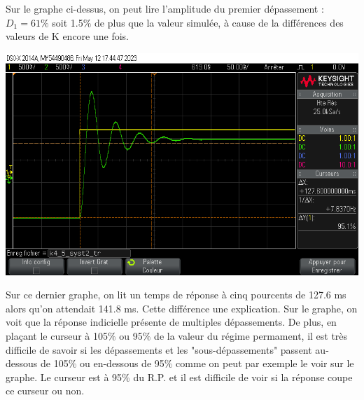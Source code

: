 \documentclass[12pt]{article}
\begin{document}
Sur le graphe ci-dessus, on peut lire l'amplitude du premier dépassement : $D_1 = 61\%$ soit 1.5$\%$ de plus que la valeur simulée, à cause de la différences des valeurs de K encore une fois.
\begin{center}
    \includegraphics[width = 16 cm]{TP3/Syst_2/P/k4_5_syst2_tr.png}
\end{center}
Sur ce dernier graphe, on lit un temps de réponse à cinq pourcents de 127.6 ms alors qu'on attendait 141.8 ms. Cette différence une explication. Sur le graphe, on voit que la réponse indicielle présente de multiples dépassements. De plus, en plaçant le curseur à 105$\%$ ou 95$\%$ de la valeur du régime permament, il est très difficile de savoir si les dépassements et les "sous-dépassements" passent au-dessous de 105$\%$ ou en-dessous de 95$\%$ comme on peut par exemple le voir sur le graphe. Le curseur est à 95$\%$ du R.P. et il est difficile de voir si la réponse coupe ce curseur ou non.
\end{document}
